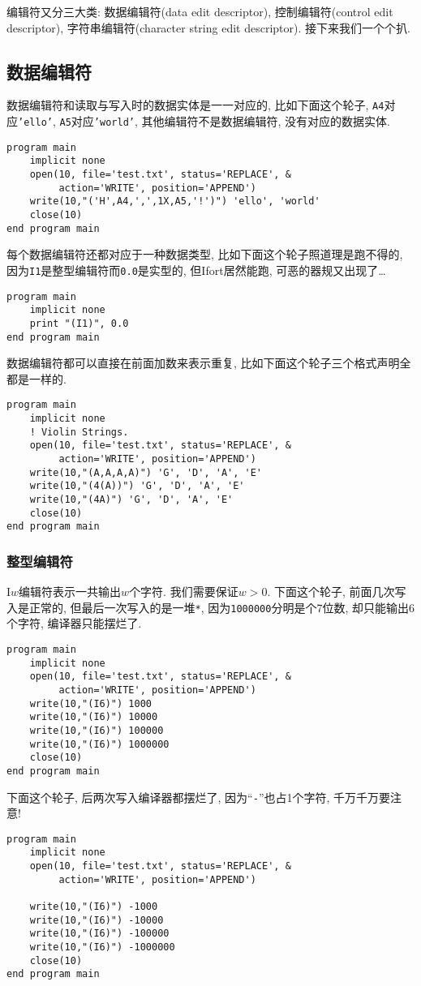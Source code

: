 编辑符又分三大类: 数据编辑符(data edit descriptor), 控制编辑符(control edit descriptor), 字符串编辑符(character string edit descriptor). 接下来我们一个个扒.

\subsection{数据编辑符}

数据编辑符和读取与写入时的数据实体是一一对应的, 比如下面这个轮子, \texttt{A4}对应\texttt{'ello'}, \texttt{A5}对应\texttt{'world'}, 其他编辑符不是数据编辑符, 没有对应的数据实体.
\begin{lstlisting}
program main
    implicit none
    open(10, file='test.txt', status='REPLACE', &
         action='WRITE', position='APPEND')
    write(10,"('H',A4,',',1X,A5,'!')") 'ello', 'world'
    close(10)
end program main
\end{lstlisting}
每个数据编辑符还都对应于一种数据类型, 比如下面这个轮子照道理是跑不得的, 因为\texttt{I1}是整型编辑符而\texttt{0.0}是实型的, 但Ifort居然能跑, 可恶的器规又出现了\dots
\begin{lstlisting}
program main
    implicit none
    print "(I1)", 0.0
end program main
\end{lstlisting}

数据编辑符都可以直接在前面加数来表示重复, 比如下面这个轮子三个格式声明全都是一样的.
\begin{lstlisting}
program main
    implicit none
    ! Violin Strings.
    open(10, file='test.txt', status='REPLACE', &
         action='WRITE', position='APPEND')
    write(10,"(A,A,A,A)") 'G', 'D', 'A', 'E'
    write(10,"(4(A))") 'G', 'D', 'A', 'E'
    write(10,"(4A)") 'G', 'D', 'A', 'E'
    close(10)
end program main
\end{lstlisting}

\subsubsection{整型编辑符}

I$w$编辑符表示一共输出$w$个字符. 我们需要保证$w>0$. 下面这个轮子, 前面几次写入是正常的, 但最后一次写入的是一堆\texttt{*}, 因为\texttt{1000000}分明是个7位数, 却只能输出6个字符, 编译器只能摆烂了.
\begin{lstlisting}
program main
    implicit none
    open(10, file='test.txt', status='REPLACE', &
         action='WRITE', position='APPEND')
    write(10,"(I6)") 1000
    write(10,"(I6)") 10000
    write(10,"(I6)") 100000
    write(10,"(I6)") 1000000
    close(10)
end program main
\end{lstlisting}
下面这个轮子, 后两次写入编译器都摆烂了, 因为``\texttt{-}''也占1个字符, 千万千万要注意!
\begin{lstlisting}
program main
    implicit none
    open(10, file='test.txt', status='REPLACE', &
         action='WRITE', position='APPEND')

    write(10,"(I6)") -1000
    write(10,"(I6)") -10000
    write(10,"(I6)") -100000
    write(10,"(I6)") -1000000
    close(10)
end program main
\end{lstlisting}

